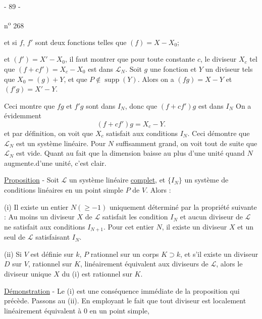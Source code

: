 \begin{center}- 89 -\end{center}\hfill n\textsuperscript{o} 268

et si $f$, $f'$ sont deux fonctions telles que $(f)=X-X_0$;

et $(f')=X'-X_0$, il faut montrer que pour toute constante $c$, le diviseur $X_c$ tel que $(f+cf')=X_c-X_0$ est dans $\mathcal L_N$. Soit $g$ une fonction et $Y$ un diviseur tels que $X_0=(g)+Y$, et que $P\notin\operatorname{supp}(Y)$. Alors on a $(fg)=X-Y$ et $(f'g)=X'-Y$.

Ceci montre que $fg$ et $f'g$ sont dans $I_N$, donc que $(f+cf')g$ est dans $I_N$ On a évidemment
\[
(f+cf')g=X_c-Y.
\]
et par définition, on voit que $X_c$ satisfait aux conditions $I_N$. Ceci démontre que $\mathcal L_N$ est un système linéaire. Pour $N$ suffisamment grand, on voit tout de suite que $\mathcal L_N$ est vide. Quant au fait que la dimension baisse au plus d'une unité quand $N$ augmente.d'une unité, c'est clair.

\uline{Proposition} - Soit $\mathcal L$ un système linéaire \uline{complet}, et $\{I_N\}$ un système de conditions linéaires en un point simple $P$ de $V$. Alors :

(i) Il existe un entier $N(\geq-1)$ uniquement déterminé par la propriété suivante : Au moins un diviseur $X$ de $\mathcal L$ satisfait les condition $I_N$ et aucun diviseur de $\mathcal L$ ne satisfait aux conditions $I_{N+1}$. Pour cet entier $N$, il existe un diviseur $X$ et un seul de $\mathcal L$ satisfaisant $I_N$.

(ii) Si $V$ est définie sur $k$, $P$ rationnel sur un corps $K\supset k$, et s'il existe un diviseur $D$ sur $V$, rationnel sur $K$, linéairement équivalent aux diviseurs de $\mathcal L$, alors le diviseur unique $X$ du (i) est rationnel sur $K$.

\uline{Démonstration} - Le (i) est une conséquence immédiate de la proposition qui précède. Passons au (ii). En employant le fait que tout diviseur est localement linéairement équivalent à $0$ en un point simple,
